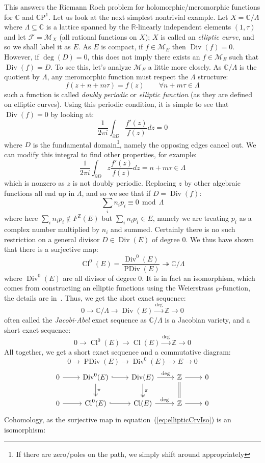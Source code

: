 \documentclass{book}
\newcommand{\R}{{\mathbb{R}}}
\newcommand{\Z}{{\mathbb{Z}}}
\newcommand{\C}{{\mathbb{C}}}
\newcommand{\CM}{{\mathcal{M}}}
\newcommand{\CF}{{\mathcal{F}}}
\newcommand{\CP}{{\mathbb{C}\mathrm{P}}}
\newcommand{\sse}{\subseteq}
\renewcommand{\mod}{\,\operatorname{mod}\,}
\newcommand{\Div}{{\operatorname{Div}}}
\newcommand{\PDiv}{{\operatorname{PDiv}}}
\renewcommand{\deg}{{\operatorname{deg}}}
\renewcommand{\div}{{\operatorname{Div}}}
\newcommand{\Cl}{{\operatorname{Cl}}}
\begin{document}
This answers the Riemann Roch problem for holomorphic/meromorphic functions for $\C$ and $\CP^1$. Let us look
at the next simplest nontrivial example. Let $X = \C/\Lambda$ where $\Lambda\sse \C$ is a lattice spanned by
the $\R$-linearly independent elements $(1,\tau)$ and let $\CF = \CM_X$ (all rational functions on $X$); $X$
is called an \emph{elliptic curve}, and so we shall label it as $E$. As $E$ is compact, if $f \in \CM_E$ then
$\div(f) = 0$. However, if $\deg(D) = 0$, this does not imply there exists an $f \in \CM_E$ such that $\div(f)
= D$. To see this, let's analyze $\CM_E$ a little more closely. As $\C/\Lambda$ is the quotient by $\Lambda$,
any meromorphic function must respect the $\Lambda$ structure:
\[
  f(z+n+m\tau) = f(z) \qquad \forall n+m\tau \in \Lambda
\]
such a function is called \emph{doubly periodic} or \emph{elliptic function} (as they are defined on elliptic
curves). Using this periodic condition, it is simple to see that
$\div(f) = 0$ by looking at:
\[
  \frac{1}{2\pi i}\int_{\partial D} \frac{f'(z)}{f(z)}dz = 0
\]
where $D$ is the fundamental domain\footnote{If there are zero/poles on the path, we simply shift around
appropriately}, namely the opposing edges cancel out. We can modify this integral to find other properties,
for example:
\[
  \frac{1}{2\pi i}\int_{\partial D} z\frac{f'(z)}{f(z)}dz = n + m\tau \in \Lambda
\]
which is nonzero as $z$ is not doubly periodic. Replacing $z$ by other algebraic functions all end up in
$\Lambda$, and so we see that if $D = \div(f)$:
\[
  \sum_i n_ip_i \equiv 0 \mod \Lambda
\]
where here $\sum_i n_ip_i\notin F^\Z(E)$ but $\sum_i n_ip_i \in E$, namely we are treating $p_i$ as a complex
number multiplied by $n_i$ and summed. Certainly there is no such restriction on
a general divisor $D \in \Div(E)$ of degree $0$. We thus have shown that there is a surjective map:
\begin{equation}\label{eq:ellipticCrvIso}
  \Cl^0(E) = \frac{\Div^0(E)}{\PDiv(E)} \twoheadrightarrow \C/\Lambda
\end{equation}
where $\Div^0(E)$ are all divisor of degree $0$. It is in fact an isomorphism, which comes from constructing
an elliptic functions using the Weierstrass $\wp$-function, the details are
in~\cite[chapter~5]{NateComplexAnalysis}. Thus, we get the short exact sequence:
\[
  0 \to \C/\Lambda \to \Div(E) \xrightarrow{\deg} \Z \to 0
\]
often called the \emph{Jacobi-Abel} exact sequence as $\C/\Lambda$ is a Jacobian variety, and a short exact sequence:
\[
  0 \to \Cl^0(E) \to \Cl(E) \xrightarrow{\deg} \Z \to 0
\]
All together, we get a short exact sequence and a commutative diagram:
\[
  0 \to \PDiv(E) \to \Div^0(E) \to E \to 0
\]
\[
\begin{tikzcd}
0 \arrow[r] & \mathrm{Div}^0(E) \arrow[r, hook] \arrow[d, two heads, "\pi"] & \mathrm{Div}(E) \arrow[r, "\deg"] \arrow[d, two heads, "\pi"] & \mathbb{Z} \arrow[r] \arrow[d, equals] & 0 \\
0 \arrow[r] & \Cl^0(E) \arrow[r, hook] & \Cl(E) \arrow[r, "\deg"] & \mathbb{Z} \arrow[r] & 0
\end{tikzcd}
\]
Cohomology, as the surjective map in equation~(\ref{eq:ellipticCrvIso}) is an isomorphism:
\end{document}
